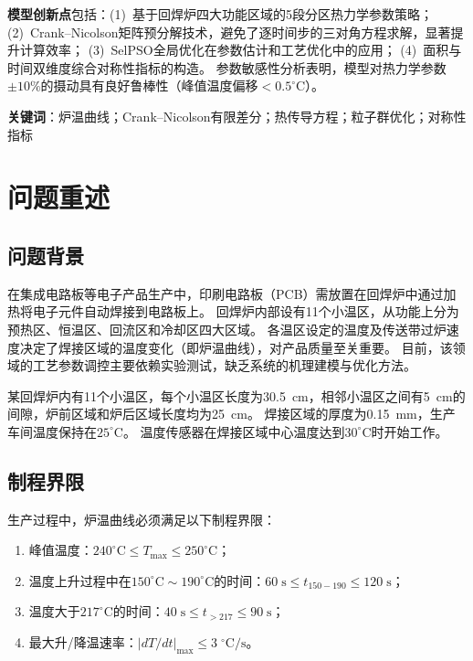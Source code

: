 \documentclass[12pt,a4paper]{ctexart}
\begin{document}
\textbf{模型创新点}包括：(1)~基于回焊炉四大功能区域的5段分区热力学参数策略；
(2)~Crank--Nicolson矩阵预分解技术，避免了逐时间步的三对角方程求解，显著提升计算效率；
(3)~SelPSO全局优化在参数估计和工艺优化中的应用；
(4)~面积与时间双维度综合对称性指标的构造。
参数敏感性分析表明，模型对热力学参数$\pm10\%$的摄动具有良好鲁棒性（峰值温度偏移$<0.5^{\circ}\mathrm{C}$）。

\begin{flushright}
    \textbf{关键词}：炉温曲线；Crank--Nicolson有限差分；热传导方程；粒子群优化；对称性指标
\end{flushright}

\newpage

\section{问题重述}

\subsection{问题背景}

在集成电路板等电子产品生产中，印刷电路板（PCB）需放置在回焊炉中通过加热将电子元件自动焊接到电路板上。
回焊炉内部设有11个小温区，从功能上分为预热区、恒温区、回流区和冷却区四大区域。
各温区设定的温度及传送带过炉速度决定了焊接区域的温度变化（即炉温曲线），对产品质量至关重要。
目前，该领域的工艺参数调控主要依赖实验测试，缺乏系统的机理建模与优化方法。

某回焊炉内有11个小温区，每个小温区长度为30.5~cm，相邻小温区之间有5~cm的间隙，炉前区域和炉后区域长度均为25~cm。
焊接区域的厚度为0.15~mm，生产车间温度保持在$25^{\circ}\mathrm{C}$。
温度传感器在焊接区域中心温度达到$30^{\circ}\mathrm{C}$时开始工作。

\subsection{制程界限}

生产过程中，炉温曲线必须满足以下制程界限：
\begin{enumerate}[label=(\arabic*),nosep]
    \item 峰值温度：$240^{\circ}\mathrm{C} \leq T_{\max} \leq 250^{\circ}\mathrm{C}$；
    \item 温度上升过程中在$150^{\circ}\mathrm{C}\sim190^{\circ}\mathrm{C}$的时间：$60\;\mathrm{s} \leq t_{150-190} \leq 120\;\mathrm{s}$；
    \item 温度大于$217^{\circ}\mathrm{C}$的时间：$40\;\mathrm{s} \leq t_{>217} \leq 90\;\mathrm{s}$；
    \item 最大升/降温速率：$|dT/dt|_{\max} \leq 3\;^{\circ}\mathrm{C}/\mathrm{s}$。
\end{enumerate}
\end{document}
